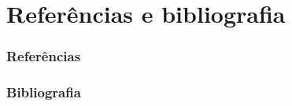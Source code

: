\documentclass[utf8, usepdftitle=false, svgnames, color={table, fixpdftex, hyperref, fixinclude, xcdraw}, t, brazil]{beamer}
\begin{document}
% 
% 		 
% 
% 		 
% 
% 		  
% 

	\part{Referências e bibliografia}

		\section{Referências}
		

		\section{Bibliografia}
		
	

% 		
\end{document}
